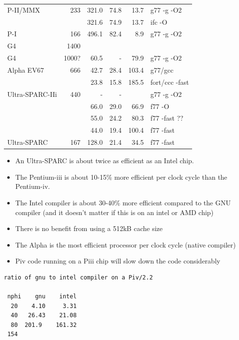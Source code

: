 \documentclass[10pt,dvips]{article}
\begin{document}
\begin{table}[htbp]
\begin{tabular}{|l|r|r|r|r|l|}
P-II/MMX        & 233   &       321.0 & 74.8  &  13.7 & g77 -g -O2 \\ %
		&	&	321.6 & 74.9  &  13.7 & ifc -O \\
P-I             & 166   &       496.1 & 82.4  &   8.9 & g77 -g -O2 \\ %
\hline
G4              & 1400  &             &       &       &         \\ %
G4              & 1000? &        60.5 & -     &  79.9 & g77 -g -O2 \\ %
\hline
Alpha EV67	& 666   &        42.7 & 28.4  & 103.4 & g77/gcc \\ %
		&       &        23.8 & 15.8  & 185.5 & fort/ccc -fast \\
Ultra-SPARC-IIi &  440  &	   -  &   -   &       & g77 -g -O2\\   %
		&  	&	 66.0 & 29.0  &  66.9 & f77 -O \\
		&  	&	 55.0 & 24.2  &  80.3 & f77 -fast  ?? \\
		&	&	 44.0 & 19.4  & 100.4 & f77 -fast \\
Ultra-SPARC     &  167  &       128.0 & 21.4  &  34.5 & f77 -fast \\
 \hline
\end{tabular}
\end{table}

\begin{itemize}
\item An Ultra-SPARC is about twice as efficient as an Intel chip.

\item The Pentium-iii is about 10-15\% more efficient per clock cycle
than the Pentium-iv.

\item The Intel compiler is about 30-40\% more efficient compared
to the GNU compiler (and it doesn't matter if this is on an intel or AMD chip)

\item There is no benefit from using a 512kB cache size 

\item The Alpha is the most efficient processor per clock cycle (native compiler)

\item Piv code running on a Piii chip will slow down the code considerably

\end{itemize}

\begin{verbatim}
ratio of gnu to intel compiler on a Piv/2.2

 nphi    gnu    intel
  20    4.10     3.31
  40   26.43    21.08
  80  201.9    161.32
 154

\end{verbatim}
\end{document}
